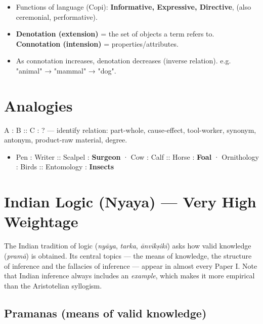 \begin{itemize}
\tightlist
\item
  Functions of language (Copi): \textbf{Informative, Expressive, Directive}, (also ceremonial, performative).
\item
  \textbf{Denotation (extension)} = the set of objects a term refers to. \textbf{Connotation (intension)} = properties/attributes.
\item
  As connotation increases, denotation decreases (inverse relation). e.g. "animal" → "mammal" → "dog".
\end{itemize}

\needspace{125pt}

\hypertarget{p1-06--6-analogies}{%
\section{Analogies}\label{p1-06--6-analogies}}

A : B :: C : ? --- identify relation: part-whole, cause-effect, tool-worker, synonym, antonym, product-raw material, degree.

\begin{itemize}
\tightlist
\item
  Pen : Writer :: Scalpel : \textbf{Surgeon} · Cow : Calf :: Horse : \textbf{Foal} · Ornithology : Birds :: Entomology : \textbf{Insects}
\end{itemize}

\needspace{161pt}

\hypertarget{p1-06--7-indian-logic-nyaya--very-high-weightage}{%
\section{Indian Logic (Nyaya) --- Very High Weightage}\label{p1-06--7-indian-logic-nyaya--very-high-weightage}}

The Indian tradition of logic (\emph{nyāya}, \emph{tarka}, \emph{ānvīkṣikī}) asks how valid knowledge (\emph{pramā}) is
obtained. Its central topics --- the means of knowledge, the structure of inference and the fallacies of
inference --- appear in almost every Paper I. Note that Indian inference always includes an \emph{example},
which makes it more empirical than the Aristotelian syllogism.

\needspace{95pt}

\hypertarget{p1-06--pramanas-means-of-valid-knowledge}{%
\subsection{Pramanas (means of valid knowledge)}\label{p1-06--pramanas-means-of-valid-knowledge}}

